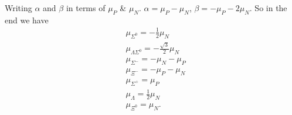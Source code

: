 \documentclass[main.tex]{subfiles}
\begin{document}
Writing $\alpha$ and $\beta$ in terms of $\mu_P$ \& $\mu_N$. $\alpha=\mu_P-\mu_N$, $\beta=-\mu_P-2\mu_N$. So in the end we have
\begin{align}
&\mu_{\Sigma^0}=-\frac{1}{2}\mu_N\\
&\mu_{\Lambda\Sigma^0}=-\frac{\sqrt{3}}{2}\mu_N\\
&\mu_{\Sigma^-}=-\mu_N-\mu_P\\
&\mu_{\Xi^-}=-\mu_P-\mu_N\\
&\mu_{\Sigma^+}=\mu_P\\
&\mu_{\Lambda}=\frac{1}{2}\mu_N\\
&\mu_{\Xi^0}=\mu_N.
\end{align}
\end{document}

